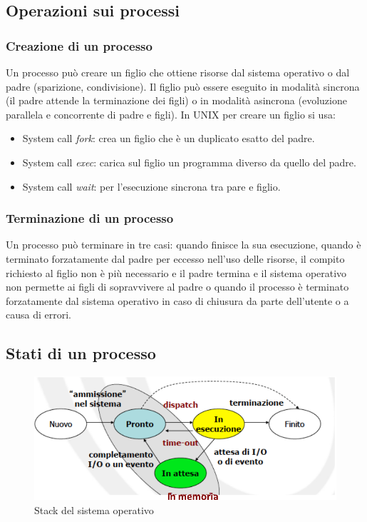 \subsection{Operazioni sui processi}
\subsubsection{Creazione di un processo}
Un processo pu\`o creare un figlio che ottiene risorse dal sistema operativo o dal padre (sparizione, condivisione). Il figlio pu\`o essere eseguito in modalit\`a sincrona (il padre
attende la terminazione dei figli) o in modalit\`a asincrona (evoluzione parallela e concorrente di padre e figli). In UNIX per creare un figlio si usa:
\begin{itemize}
	\item System call \emph{fork}: crea un figlio che \`e un duplicato esatto del padre.
	\item System call \emph{exec}: carica sul figlio un programma diverso da quello del padre.
	\item System call \emph{wait}: per l'esecuzione sincrona tra pare e figlio.
\end{itemize}
\subsubsection{Terminazione di un processo}
Un processo pu\`o terminare in tre casi: quando finisce la sua esecuzione, quando \`e terminato forzatamente dal padre per eccesso nell'uso delle risorse, il compito richiesto al figlio
non \`e pi\`u necessario e il padre termina e il sistema operativo non permette ai figli di sopravvivere al padre o quando il processo \`e terminato forzatamente dal sistema operativo
in caso di chiusura da parte dell'utente o a causa di errori. 
\subsection{Stati di un processo}
\begin{figure}[h]
	\includegraphics[width=\textwidth]{Pictures/StatiProcesso.png}
	\caption{Stack del sistema operativo}
\end{figure}
